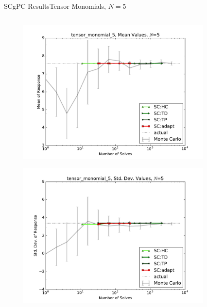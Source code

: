 \documentclass{beamer}
\begin{document}
\begin{frame}{SCgPC Results}{Tensor Monomials, $N=5$}\vspace{-20pt}
 \begin{columns}
   \begin{column}{0.5\textwidth}
        \begin{figure}[h!]
          \centering
          \includegraphics[width=0.8\linewidth]{anlmodels/tensor_monomial_5_mean_vals_nohdmr}
        \end{figure}
        \vspace{-20pt}
        \begin{figure}[h!]
          \centering
          \includegraphics[width=0.8\linewidth]{anlmodels/tensor_monomial_5_var_vals_nohdmr}
        \end{figure}
   \end{column}
   \begin{column}{0.5\textwidth}
        \begin{figure}[h!]
          \centering

\end{figure}
\end{column}
\end{columns}
\end{frame}
\end{document}
